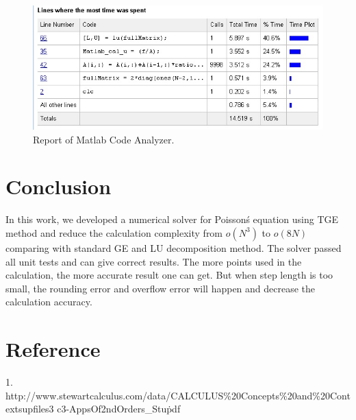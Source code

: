 \documentclass{article}
\begin{document}
\begin{figure}[h]
\centering
\includegraphics[width=0.6\linewidth]{../figures/RunTimeAnalysis}
\caption{Report of Matlab Code Analyzer.}
\label{fig:RunTimeAnalysis}
\end{figure}

\section{Conclusion}
In this work, we developed a numerical solver for Poisson\'s equation using TGE method and reduce the calculation complexity from $o(N^3)$ to $o(8N)$ comparing with standard GE and LU decomposition method. The solver passed all unit tests and can give correct results. The more points used in the calculation, the more accurate result one can get. But when step length is too small, the rounding error and overflow error will happen and decrease the calculation accuracy. 

\section{Reference}

1. http://www.stewartcalculus.com/data/CALCULUS\%20Concepts\%20and\%20Contexts\/upfiles\/3
c3-AppsOf2ndOrders\_Stu\.pdf
\end{document}
